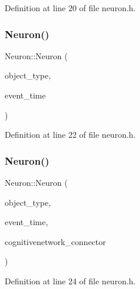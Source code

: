 Definition at line 20 of file neuron.\+h.

\mbox{\label{class_neuron_a4611499895417d44250c452d0fc719a6}} 
\subsubsection{\texorpdfstring{Neuron()}{Neuron()}\hspace{0.1cm}{\footnotesize\ttfamily [3/4]}}
{\footnotesize\ttfamily Neuron\+::\+Neuron (\begin{DoxyParamCaption}\item[{unsigned int}]{object\+\_\+type,  }\item[{std\+::chrono\+::time\+\_\+point$<$ \mbox{\hyperlink{universe_8h_a0ef8d951d1ca5ab3cfaf7ab4c7a6fd80}{Clock}} $>$}]{event\+\_\+time }\end{DoxyParamCaption})\hspace{0.3cm}{\ttfamily [inline]}}



Definition at line 22 of file neuron.\+h.

\mbox{\label{class_neuron_a6839febd20fb8f776151e00142411a56}} 
\subsubsection{\texorpdfstring{Neuron()}{Neuron()}\hspace{0.1cm}{\footnotesize\ttfamily [4/4]}}
{\footnotesize\ttfamily Neuron\+::\+Neuron (\begin{DoxyParamCaption}\item[{unsigned int}]{object\+\_\+type,  }\item[{std\+::chrono\+::time\+\_\+point$<$ \mbox{\hyperlink{universe_8h_a0ef8d951d1ca5ab3cfaf7ab4c7a6fd80}{Clock}} $>$}]{event\+\_\+time,  }\item[{\mbox{\hyperlink{class_cognitive_network}{Cognitive\+Network}} \&}]{cognitivenetwork\+\_\+connector }\end{DoxyParamCaption})\hspace{0.3cm}{\ttfamily [inline]}}



Definition at line 24 of file neuron.\+h.

